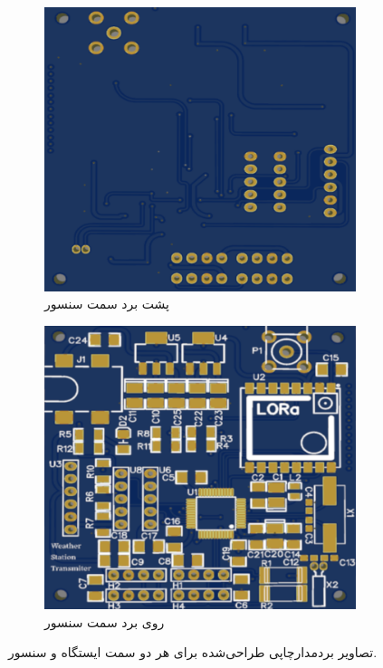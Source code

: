 \begin{figure}[!h]
\begin{subfigure}[b]{0.5\textwidth}
		\includegraphics[width=\linewidth]{Assets/transmitterBack.png}
		\caption{پشت برد سمت سنسور}
		\label{fig:transmitterBack}
	\end{subfigure}
	\begin{subfigure}[b]{0.5\textwidth}
		\includegraphics[width=\linewidth]{Assets/transmitterFront.png}
		\caption{روی برد سمت سنسور}
		\label{fig:transmitterFront}
	\end{subfigure}
	\caption{تصاویر بردمدارچاپی طراحی‌شده برای هر دو سمت ایستگاه و سنسور.}
	\label{fig:PCB}
\end{figure}

